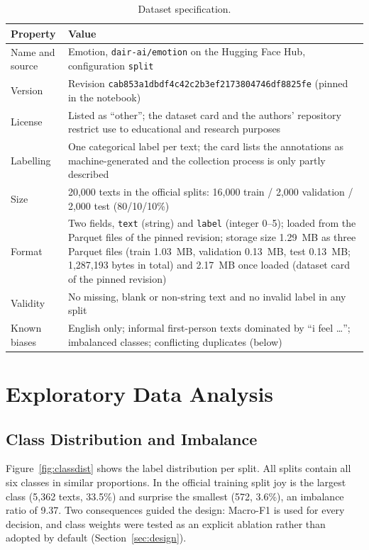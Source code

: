 \documentclass[11pt,a4paper]{article}
\begin{document}
\begin{table}[H]
\centering
\caption{Dataset specification.}
\label{tab:dataset}
\begin{tabularx}{\textwidth}{@{}p{4.2cm}L@{}}
\toprule
\textbf{Property} & \textbf{Value}\\
\midrule
Name and source & Emotion, \texttt{dair-ai/emotion} on the Hugging Face Hub, configuration \texttt{split} \cite{saravia2018}\\
Version & Revision \texttt{cab853a1dbdf4c42c2b3ef2173804746df8825fe} (pinned in the notebook)\\
License & Listed as ``other''; the dataset card and the authors' repository restrict use to educational and research purposes\\
Labelling & One categorical label per text; the card lists the annotations as machine-generated and the collection process is only partly described\\
Size & 20,000 texts in the official splits: 16,000 train / 2,000 validation / 2,000 test (80/10/10\%)\\
Format & Two fields, \texttt{text} (string) and \texttt{label} (integer 0--5); loaded from the Parquet files of the pinned revision; storage size 1.29~MB as three Parquet files (train 1.03~MB, validation 0.13~MB, test 0.13~MB; 1,287,193 bytes in total) and 2.17~MB once loaded (dataset card of the pinned revision)\\
Validity & No missing, blank or non-string text and no invalid label in any split\\
Known biases & English only; informal first-person texts dominated by ``i feel \ldots''; imbalanced classes; conflicting duplicates (below)\\
\bottomrule
\end{tabularx}
\end{table}

\section{Exploratory Data Analysis}

\subsection{Class Distribution and Imbalance}
Figure~\ref{fig:classdist} shows the label distribution per split. All splits contain all six classes in similar proportions. In the official training split joy is the largest class (5,362 texts, 33.5\%) and surprise the smallest (572, 3.6\%), an imbalance ratio of 9.37. Two consequences guided the design: Macro-F1 is used for every decision, and class weights were tested as an explicit ablation rather than adopted by default (Section~\ref{sec:design}).
\end{document}
